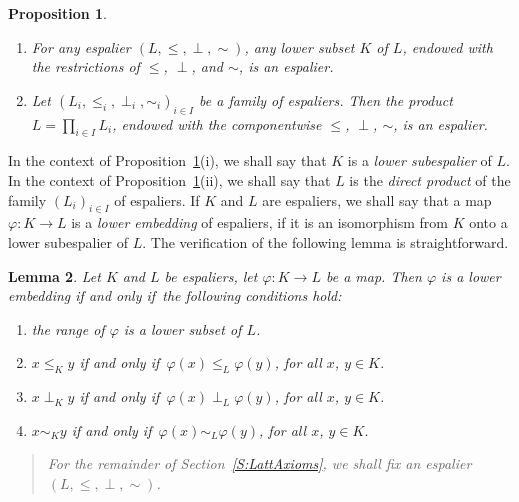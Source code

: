 \documentclass[psamsfonts,reqno]{memo-l}
\theoremstyle{plain}
\newtheorem{lemma}{Lemma}[section]
\newtheorem{proposition}[lemma]{Proposition}
\theoremstyle{definition}
\theoremstyle{remark}
\numberwithin{equation}{section}
\renewcommand{\iff}{if and only if}
\begin{document}
\begin{proposition}\label{P:LSPEsp}\hfill
\begin{enumerate}
\item For any espalier $(L,\leq,\perp,\sim)$, any lower
subset $K$ of $L$, endowed with the restrictions of $\leq$, $\perp$, and
$\sim$, is an espalier.

\item Let $(L_i,\leq_i,\perp_i,\sim_i)_{i\in I}$ be a family of espaliers.
Then the product $L=\prod_{i\in I}L_i$, endowed with the componentwise $\leq$,
$\perp$, $\sim$, is an espalier.
\end{enumerate}
\end{proposition}

In the context of Proposition~\ref{P:LSPEsp}(i), we shall say that $K$ is a
\emph{lower subespalier} of $L$. In the
context of Proposition~\ref{P:LSPEsp}(ii), we shall say that $L$ is the
\emph{direct product} of the family $(L_i)_{i\in I}$ of espaliers. If $K$ and
$L$ are espaliers, we shall say that a map $\varphi\colon K\to L$
is a \emph{lower embedding} of espaliers, if it is an
isomorphism from $K$ onto a lower subespalier of $L$. The verification of
the following lemma is straightforward.

\begin{lemma}\label{L:LowEmbEsp}
Let $K$ and $L$ be espaliers, let $\varphi\colon K\to L$ be
a map. Then $\varphi$ is a lower embedding \iff\ the
following conditions hold:
\begin{enumerate}
\item the range of $\varphi$ is a lower subset of $L$.

\item $x\leq_Ky$ \iff\ $\varphi(x)\leq_L\varphi(y)$, for all $x$, $y\in K$.

\item $x\perp_Ky$ \iff\ $\varphi(x)\perp_L\varphi(y)$, for all $x$, $y\in K$.

\item $x\sim_Ky$ \iff\ $\varphi(x)\sim_L\varphi(y)$, for all $x$, $y\in K$.
\end{enumerate}
\end{lemma}

\begin{quote}
\em For the remainder of Section~\textup{\ref{S:LattAxioms}}, we shall
fix an espalier\linebreak $(L,\leq,\perp,\sim)$.
\end{quote}
\end{document}
